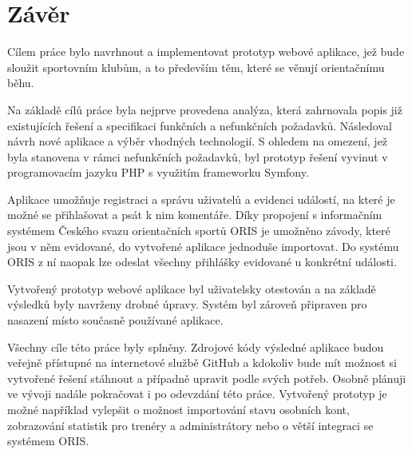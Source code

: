 \chapter{Závěr}

Cílem práce bylo navrhnout a implementovat prototyp webové aplikace, jež bude sloužit sportovním klubům, a to především těm, které se věnují orientačnímu běhu.

Na základě cílů práce byla nejprve provedena analýza, která zahrnovala popis již existujících řešení a specifikaci funkčních a nefunkčních požadavků. Následoval návrh nové aplikace a výběr vhodných technologií. S ohledem na omezení, jež byla stanovena v rámci nefunkčních požadavků, byl prototyp řešení vyvinut v programovacím jazyku PHP s využitím frameworku Symfony.

Aplikace umožňuje registraci a správu uživatelů a evidenci událostí, na které je možné se přihlašovat a psát k nim komentáře. Díky propojení s informačním systémem Českého svazu orientačních sportů ORIS je umožněno závody, které jsou v něm evidované, do vytvořené aplikace jednoduše importovat. Do systému ORIS z ní naopak lze odeslat všechny přihlášky evidované u konkrétní události.

Vytvořený prototyp webové aplikace byl uživatelsky otestován a na základě výsledků byly navrženy drobné úpravy. Systém byl zároveň připraven pro nasazení místo současně používané aplikace.

Všechny cíle této práce byly splněny. Zdrojové kódy výsledné aplikace budou veřejně přístupné na internetové službě GitHub a kdokoliv bude mít možnost si vytvořené řešení stáhnout a případně upravit podle svých potřeb. Osobně plánuji ve vývoji nadále pokračovat i po odevzdání této práce. Vytvořený prototyp je možné například vylepšit o možnost importování stavu osobních kont, zobrazování statistik pro trenéry a administrátory nebo o větší integraci se systémem ORIS.
